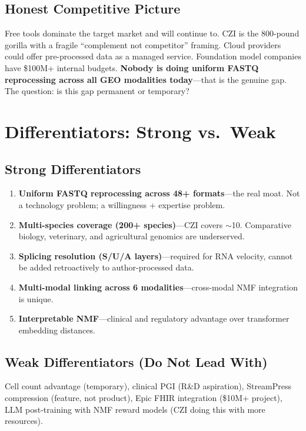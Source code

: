 \documentclass[10pt,twocolumn,letterpaper]{article}
\begin{document}
\subsection{Honest Competitive Picture}

Free tools dominate the target market and will continue to. CZI is the
800-pound gorilla with a fragile ``complement not competitor'' framing.
Cloud providers could offer pre-processed data as a managed service. Foundation
model companies have \$100M+ internal budgets. \textbf{Nobody is doing uniform
FASTQ reprocessing across all GEO modalities today}---that is the genuine gap.
The question: is this gap permanent or temporary?

\section{Differentiators: Strong vs.\ Weak}
\label{sec:differentiators}

\subsection{Strong Differentiators}

\begin{enumerate}
  \item \textbf{Uniform FASTQ reprocessing across 48+ formats}---the real moat.
    Not a technology problem; a willingness + expertise problem.
  \item \textbf{Multi-species coverage (200+ species)}---CZI covers $\sim$10.
    Comparative biology, veterinary, and agricultural genomics are underserved.
  \item \textbf{Splicing resolution (S/U/A layers)}---required for RNA velocity,
    cannot be added retroactively to author-processed data.
  \item \textbf{Multi-modal linking across 6 modalities}---cross-modal NMF
    integration is unique.
  \item \textbf{Interpretable NMF}---clinical and regulatory advantage over
    transformer embedding distances.
\end{enumerate}

\subsection{Weak Differentiators (Do Not Lead With)}

Cell count advantage (temporary), clinical PGI (R\&D aspiration), StreamPress
compression (feature, not product), Epic FHIR integration (\$10M+ project),
LLM post-training with NMF reward models (CZI doing this with more resources).
\end{document}
